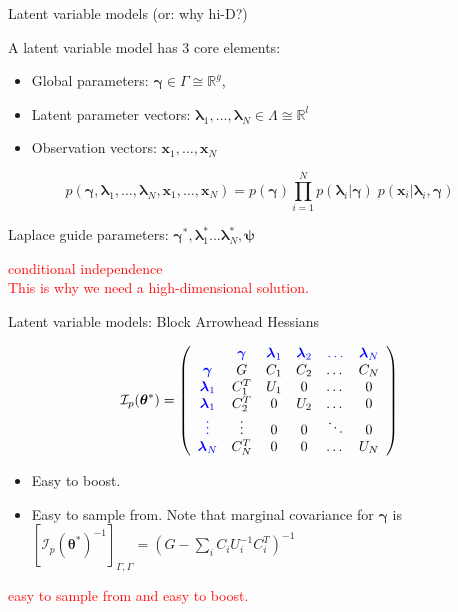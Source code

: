 \documentclass[
  ignorenonframetext,
]{beamer}
\providecommand{\tightlist}{%
  \setlength{\itemsep}{0pt}\setlength{\parskip}{0pt}}
\begin{document}
\begin{frame}{Latent variable models (or: why hi-D?)}
\protect\hypertarget{latent-variable-models-or-why-hi-d}{}

A latent variable model has 3 core elements:

\begin{itemize}
\tightlist
\item
  Global parameters: \(\bm{\gamma}\in\Gamma \cong \mathbb{R}^g\),
\item
  Latent parameter vectors:
  \(\bm{\lambda}_1,\dots,\bm{\lambda}_N\in\Lambda \cong \mathbb{R}^l\)
\item
  Observation vectors: \(\bm{x}_1,\dots,\bm{x}_N\)
\end{itemize}

\[p\left(\bm{\gamma}, \bm{\lambda}_1,\dots,\bm{\lambda}_N,\bm{x}_1,\dots,\bm{x}_N\right) = p(\bm{\gamma})\prod_{i=1}^N p(\bm{\lambda}_i|\bm{\gamma})\; p(\bm{x}_i|\bm{\lambda}_i,\bm{\gamma})\]

Laplace guide parameters:
\(\bm{\gamma}^*,\bm{\lambda}^*_1...\bm{\lambda}^*_N,\bm{\psi}\)

\textcolor{red}{{\scriptsize conditional independence\\This is why we need a high-dimensional solution.}}

\end{frame}

\begin{frame}{Latent variable models: Block Arrowhead Hessians}
\protect\hypertarget{latent-variable-models-block-arrowhead-hessians}{}

\[\mathcal{I}_p(\bm{\theta}^*) = \left(\begin{array}{cccccc}
    & \textcolor{blue}{\bm{\gamma}} & \textcolor{blue}{\bm{\lambda}_1} & \textcolor{blue}{\bm{\lambda}_2} & \textcolor{blue}{\dots} & \textcolor{blue}{\bm{\lambda}_N} \\
   \textcolor{blue}{\bm{\gamma}} & G & C_1 & C_2 & \dots & C_N \\
   \textcolor{blue}{\bm{\lambda}_1} & C_1^T & U_1 & 0 & \dots & 0 \\
   \textcolor{blue}{\bm{\lambda}_1} & C_2^T & 0 & U_2 & \dots & 0 \\
   \textcolor{blue}{\vdots} & \vdots & 0 & 0 & \ddots & 0 \\
   \textcolor{blue}{\bm{\lambda}_N} & C_N^T & 0 & 0 & \dots & U_N
   \end{array}\right)\]

\begin{itemize}
\tightlist
\item
  Easy to boost.
\item
  Easy to sample from. Note that marginal covariance for \(\bm{\gamma}\)
  is
  \([\mathcal{I}_p(\bm{\theta}^*)^{-1}]_{\Gamma,\Gamma}=(G-\sum_i C_iU_i^{-1}C_i^T)^{-1}\)
\end{itemize}

\textcolor{red}{{\scriptsize easy to sample from and easy to boost.}}

\end{frame}
\end{document}
